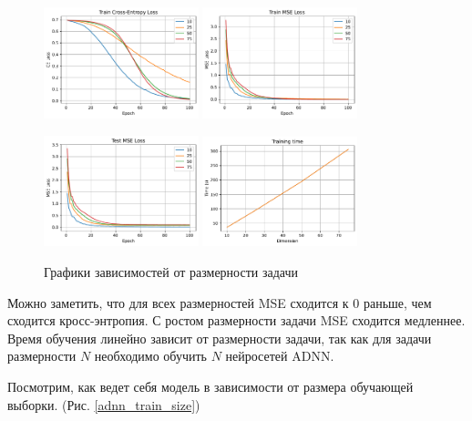\documentclass[12pt]{article}
\begin{document}
\begin{figure}[H]
    \centering
    \includegraphics[width=0.4\textwidth]{adnn_dim_epoch_train_loss.pdf}
    \quad
    \includegraphics[width=0.4\textwidth]{adnn_dim_epoch_train_mse.pdf}
    
    \includegraphics[width=0.4\textwidth]{adnn_dim_epoch_test_mse.pdf}
    \quad
    \includegraphics[width=0.4\textwidth]{adnn_time_dim.pdf}
    \caption{Графики зависимостей от размерности задачи}
    \label{adnn_dim}
\end{figure}

Можно заметить, что для всех размерностей MSE сходится к 0 раньше, чем сходится кросс-энтропия. С ростом размерности задачи MSE сходится медленнее. Время обучения линейно зависит от размерности задачи, так как для задачи размерности $N$ необходимо обучить $N$ нейросетей ADNN.

Посмотрим, как ведет себя модель в зависимости от размера обучающей выборки. (Рис. \ref{adnn_train_size}) 
\end{document}
